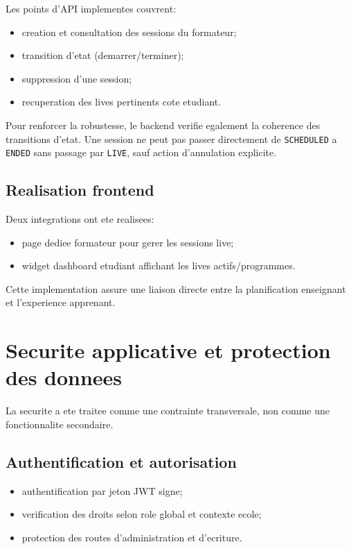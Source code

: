 ﻿\documentclass[12pt,a4paper,oneside]{report}
\begin{document}
Les points d'API implementes couvrent:
\begin{itemize}
  \item creation et consultation des sessions du formateur;
  \item transition d'etat (demarrer/terminer);
  \item suppression d'une session;
  \item recuperation des lives pertinents cote etudiant.
\end{itemize}

Pour renforcer la robustesse, le backend verifie egalement la coherence des transitions d'etat. Une session ne peut pas passer directement de \texttt{SCHEDULED} a \texttt{ENDED} sans passage par \texttt{LIVE}, sauf action d'annulation explicite.

\subsection{Realisation frontend}

Deux integrations ont ete realisees:
\begin{itemize}
  \item page dediee formateur pour gerer les sessions live;
  \item widget dashboard etudiant affichant les lives actifs/programmes.
\end{itemize}

Cette implementation assure une liaison directe entre la planification enseignant et l'experience apprenant.

\section{Securite applicative et protection des donnees}

La securite a ete traitee comme une contrainte transversale, non comme une fonctionnalite secondaire.

\subsection{Authentification et autorisation}

\begin{itemize}
  \item authentification par jeton JWT signe;
  \item verification des droits selon role global et contexte ecole;
  \item protection des routes d'administration et d'ecriture.
\end{itemize}
\end{document}
